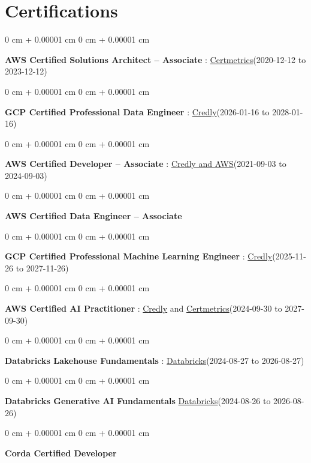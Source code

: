 \documentclass[10pt, letterpaper]{article}
\newenvironment{onecolentry}{
    \begin{adjustwidth}{
        0 cm + 0.00001 cm
    }{
        0 cm + 0.00001 cm
    }
}{
    \end{adjustwidth}
} %
\begin{document}
    \vspace{2 pt }
    \section{Certifications}
        \vspace{2 pt }
        \begin{samepage}
            \begin{onecolentry}
                \textbf{AWS Certified Solutions Architect -- Associate} : \href{https://cp.certmetrics.com/amazon/en/public/verify/credential/SNBY48EBJJVE1SWX}{Certmetrics}(2020-12-12 to 2023-12-12)
            \end{onecolentry}
            \begin{onecolentry}
                \textbf{GCP Certified Professional Data Engineer} : \href{https://www.credly.com/badges/977e96d9-12e7-4f6c-b8a7-df71fb7153b8/public_url}{Credly}(2026-01-16 to 2028-01-16)
            \end{onecolentry}
            \begin{onecolentry}
                \textbf{AWS Certified Developer -- Associate} : \href{https://www.credly.com/badges/b8106fbd-d3d1-4204-8cdf-e708798fd582/public_url}{Credly and AWS}(2021-09-03  to 2024-09-03)
            \end{onecolentry}
            \begin{onecolentry}
                \textbf{AWS Certified Data Engineer -- Associate}
            \end{onecolentry}
            \begin{onecolentry}
                \textbf{GCP Certified Professional Machine Learning Engineer} : \href{https://www.credly.com/badges/a6965347-09ea-4d8f-b398-0e151407160d/public_url}{Credly}(2025-11-26 to 2027-11-26)
            \end{onecolentry}
            \begin{onecolentry}
                \textbf{AWS Certified AI Practitioner} : \href{https://www.credly.com/badges/451b7ba5-8be1-4a8e-bbec-ade26627a6b6/public_url}{Credly} and \href{https://cp.certmetrics.com/amazon/en/public/verify/credential/495f0d9853874bf9a33c17f8e89ce131}{Certmetrics}(2024-09-30 to 2027-09-30)
            \end{onecolentry}
            \begin{onecolentry}
                \textbf{Databricks Lakehouse Fundamentals} : \href{https://scl.io/FXGKS0u}{Databricks}(2024-08-27 to 2026-08-27)
            \end{onecolentry}
            \begin{onecolentry}
                \textbf{Databricks Generative AI Fundamentals} \href{https://sgq.io/3uIFGNi}{Databricks}(2024-08-26 to 2026-08-26)
            \end{onecolentry}
            \begin{onecolentry}
                \textbf{Corda Certified Developer}
            \end{onecolentry}
        \end{samepage}
\end{document}
